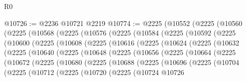 \begin{lexlean}{R0}
\begin{coremodule}
@10726 := @2236 @10721 @2219
@10774 := @2225
    (@10552
      (@2225
        (@10560
          (@2225
            (@10568
              (@2225
                (@10576
                  (@2225
                    (@10584
                      (@2225
                        (@10592
                          (@2225
                            (@10600
                              (@2225
                                (@10608
                                  (@2225
                                    (@10616
                                      (@2225
                                        (@10624
                                          (@2225
                                            (@10632
                                              (@2225
                                                (@10640
                                                  (@2225
                                                    (@10648
                                                      (@2225
                                                        (@10656
                                                          (@2225
                                                            (@10664
                                                              (@2225
                                                                (@10672
                                                                  (@2225
                                                                    (@10680
                                                                      (@2225
                                                                        (@10688
                                                                          (@2225
                                                                            (@10696
                                                                              (@2225
                                                                                (@10704
                                                                                  (@2225
                                                                                    (@10712
                                                                                      (@2225
                                                                                        (@10720
                                                                                          (@2225
                                                                                            (@10724
                                                                                              @10726

\end{coremodule}
\end{lexlean}
